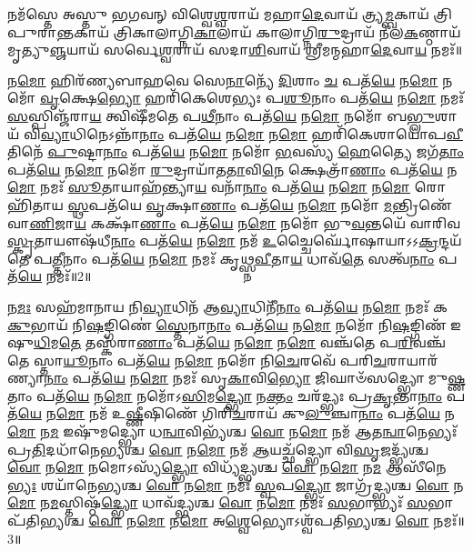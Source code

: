  
𑌨𑌮᳴𑌸𑍍𑌤𑍇 𑌅𑌸𑍍𑌤𑍁 𑌭𑌗𑌵𑌨𑍍 𑌵𑌿𑌶𑍍𑌵𑍇\-\ul{𑌶𑍍𑌵}\-𑌰𑌾𑌯᳴ 𑌮𑌹𑌾\-\ul{𑌦𑍇}\-𑌵𑌾𑌯᳴ 𑌤𑍍𑌰𑍍𑌯\-\ul{𑌮𑍍𑌬}\-𑌕𑌾𑌯᳴ 𑌤𑍍𑌰𑌿𑌪𑍁𑌰𑌾\-\ul{𑌨𑍍𑌤}\-𑌕𑌾𑌯᳴ 𑌤𑍍𑌰𑌿𑌕𑌾𑌲𑌾𑌗𑍍𑌨𑌿\-\ul{𑌕𑌾}\-𑌲𑌾𑌯᳴ 𑌕𑌾𑌲𑌾𑌗𑍍𑌨𑌿\-\ul{𑌰𑍁}\-𑌦𑍍𑌰𑌾𑌯᳴ 𑌨𑍀𑌲\-\ul{𑌕}\-𑌣𑍍𑌠𑌾𑌯᳴ 𑌮𑍃𑌤𑍍𑌯𑍁\-\ul{𑌞𑍍𑌜}\-𑌯𑌾𑌯᳴ 𑌸𑌰𑍍𑌵𑍇\-\ul{𑌶𑍍𑌵}\-𑌰𑌾𑌯᳴ 𑌸𑌦𑌾\-\ul{𑌶𑌿}\-𑌵𑌾𑌯᳴ 𑌶𑍍𑌰𑍀𑌮𑌨𑍍𑌮𑌹𑌾\-\ul{𑌦𑍇}\-𑌵𑌾\-\ul{𑌯} 𑌨𑌮𑌃᳴॥ 

𑌨\-\ul{𑌮𑍋} 𑌹𑌿𑌰᳴𑌣𑍍𑌯𑌬𑌾𑌹𑌵𑍇 𑌸𑍇\-\ul{𑌨𑌾}\-𑌨𑍍𑌯𑍇᳴ \ul{𑌦𑌿}\-𑌶𑌾𑌂 \ul{𑌚} 𑌪𑌤᳴\-\ul{𑌯𑍇} 𑌨\-\ul{𑌮𑍋} 𑌨𑌮𑍋᳴ \ul{𑌵𑍃}\-𑌕𑍍𑌷𑍇\-\ul{𑌭𑍍𑌯𑍋} 𑌹𑌰𑌿᳴𑌕𑍇𑌶𑍇𑌭𑍍𑌯𑌃 𑌪\-\ul{𑌶𑍂}\-𑌨𑌾𑌂 𑌪𑌤᳴\-\ul{𑌯𑍇} 𑌨\-\ul{𑌮𑍋} 𑌨𑌮𑌃᳴ \ul{𑌸}\-𑌸𑍍𑌪𑌿𑌞𑍍𑌜᳴𑌰𑌾\-\ul{𑌯} 𑌤𑍍𑌵𑌿𑌷𑍀᳴𑌮𑌤𑍇 𑌪\-\ul{𑌥𑍀}\-𑌨𑌾𑌂 𑌪𑌤᳴\-\ul{𑌯𑍇} 𑌨\-\ul{𑌮𑍋} 𑌨𑌮𑍋᳴ 𑌬\-\ul{𑌭𑍍𑌲𑍁}\-𑌶𑌾𑌯᳴ 𑌵𑌿\-\ul{𑌵𑍍𑌯𑌾}\-𑌧𑌿𑌨𑍇\-𑌽𑌨𑍍𑌨𑌾᳴\-\ul{𑌨𑌾𑌂} 𑌪𑌤᳴\-\ul{𑌯𑍇} 𑌨\-\ul{𑌮𑍋} 𑌨\-\ul{𑌮𑍋} 𑌹𑌰𑌿᳴𑌕𑍇𑌶𑌾𑌯𑍋𑌪\-\ul{𑌵𑍀}\-𑌤𑌿𑌨𑍇᳴ \ul{𑌪𑍁}\-𑌷𑍍𑌟𑌾\-\ul{𑌨𑌾𑌂} 𑌪𑌤᳴\-\ul{𑌯𑍇} 𑌨\-\ul{𑌮𑍋} 𑌨𑌮𑍋᳴ \ul{𑌭}\-𑌵𑌸𑍍𑌯᳴ \ul{𑌹𑍇}\-𑌤𑍍𑌯𑍈 𑌜𑌗᳴\-\ul{𑌤𑌾𑌂} 𑌪𑌤᳴\-\ul{𑌯𑍇} 𑌨\-\ul{𑌮𑍋} 𑌨𑌮𑍋᳴ \ul{𑌰𑍁}\-𑌦𑍍𑌰𑌾𑌯𑌾᳴𑌤\-\ul{𑌤𑌾}\-𑌵𑌿\-\ul{𑌨𑍇} 𑌕𑍍𑌷𑍇𑌤𑍍𑌰𑌾᳴\-\ul{𑌣𑌾𑌂} 𑌪𑌤᳴\-\ul{𑌯𑍇} 𑌨\-\ul{𑌮𑍋} 𑌨𑌮𑌃᳴ \ul{𑌸𑍂}\-𑌤𑌾𑌯𑌾𑌹᳴𑌨𑍍𑌤𑍍𑌯𑌾\-\ul{𑌯} 𑌵𑌨𑌾᳴\-\ul{𑌨𑌾𑌂} 𑌪𑌤᳴\-\ul{𑌯𑍇} 𑌨\-\ul{𑌮𑍋} 𑌨\-\ul{𑌮𑍋} 𑌰𑍋𑌹𑌿᳴𑌤𑌾𑌯 \ul{𑌸𑍍𑌥}\-𑌪𑌤᳴𑌯𑍇 \ul{𑌵𑍃}\-𑌕𑍍𑌷𑌾\-\ul{𑌣𑌾𑌂} 𑌪𑌤᳴\-\ul{𑌯𑍇} 𑌨\-\ul{𑌮𑍋} 𑌨𑌮𑍋᳴ \ul{𑌮}\-𑌨𑍍𑌤𑍍𑌰𑌿𑌣𑍇᳴ 𑌵𑌾\-\ul{𑌣𑌿}\-𑌜𑌾\-\ul{𑌯} 𑌕𑌕𑍍𑌷𑌾᳴\-\ul{𑌣𑌾𑌂} 𑌪𑌤᳴\-\ul{𑌯𑍇} 𑌨\-\ul{𑌮𑍋} 𑌨𑌮𑍋᳴ 𑌭𑍁\-\ul{𑌵}\-𑌨𑍍𑌤𑌯𑍇᳴ 𑌵𑌾𑌰𑌿𑌵\-\ul{𑌸𑍍𑌕𑍃}\-𑌤𑌾𑌯𑍗𑌷᳴𑌧𑍀\-\ul{𑌨𑌾𑌂} 𑌪𑌤᳴\-\ul{𑌯𑍇} 𑌨\-\ul{𑌮𑍋} 𑌨𑌮᳴ \ul{𑌉}\-𑌚𑍍𑌚𑍈𑌰𑍍𑌘𑍋᳴𑌷𑌾\-𑌯𑌾\-𑌽𑌽\-\-\ul{𑌕𑍍𑌰}\-𑌨𑍍𑌦𑌯᳴𑌤𑍇 𑌪\-\ul{𑌤𑍍𑌤𑍀}\-𑌨𑌾𑌂 𑌪𑌤᳴\-\ul{𑌯𑍇} 𑌨\-\ul{𑌮𑍋} 𑌨𑌮𑌃᳴ 𑌕𑍃𑌥𑍍𑌸𑍍𑌨\-\ul{𑌵𑍀}\-𑌤𑌾\-\ul{𑌯} 𑌧𑌾𑌵᳴\-\ul{𑌤𑍇} 𑌸𑌤𑍍𑌵᳴\-\ul{𑌨𑌾𑌂} 𑌪𑌤᳴\-\ul{𑌯𑍇} 𑌨𑌮𑌃᳴॥2॥ 

𑌨\-\ul{𑌮𑌃} 𑌸𑌹᳴𑌮𑌾𑌨𑌾𑌯 𑌨𑌿\-\ul{𑌵𑍍𑌯𑌾}\-𑌧𑌿𑌨᳴ 𑌆\-\ul{𑌵𑍍𑌯𑌾}\-𑌧𑌿𑌨𑍀᳴\-\ul{𑌨𑌾𑌂} 𑌪𑌤᳴\-\ul{𑌯𑍇} 𑌨\-\ul{𑌮𑍋} 𑌨𑌮𑌃᳴ 𑌕\-\ul{𑌕𑍁}\-𑌭𑌾𑌯᳴ 𑌨𑌿\-\ul{𑌷}\-𑌙𑍍𑌗𑌿𑌣𑍇॑ \ul{𑌸𑍍𑌤𑍇}\-𑌨𑌾\-\ul{𑌨𑌾𑌂} 𑌪𑌤᳴\-\ul{𑌯𑍇} 𑌨\-\ul{𑌮𑍋} 𑌨𑌮𑍋᳴ 𑌨𑌿\-\ul{𑌷}\-𑌙𑍍𑌗𑌿𑌣᳴ 𑌇𑌷𑍁\-\ul{𑌧𑌿}\-𑌮\-\ul{𑌤𑍇} 𑌤𑌸𑍍𑌕᳴𑌰𑌾\-\ul{𑌣𑌾𑌂} 𑌪𑌤᳴\-\ul{𑌯𑍇} 𑌨\-\ul{𑌮𑍋} 𑌨\-\ul{𑌮𑍋} 𑌵𑌞𑍍𑌚᳴𑌤𑍇 𑌪\-\ul{𑌰𑌿}\-𑌵𑌞𑍍𑌚᳴𑌤𑍇 𑌸𑍍𑌤𑌾\-\ul{𑌯𑍂}\-𑌨𑌾𑌂 𑌪𑌤᳴\-\ul{𑌯𑍇} 𑌨\-\ul{𑌮𑍋} 𑌨𑌮𑍋᳴ 𑌨𑌿\-\ul{𑌚𑍇}\-𑌰𑌵𑍇᳴ 𑌪𑌰𑌿\-\ul{𑌚}\-𑌰𑌾𑌯𑌾𑌰᳴𑌣𑍍𑌯𑌾\-\ul{𑌨𑌾𑌂} 𑌪𑌤᳴\-\ul{𑌯𑍇} 𑌨\-\ul{𑌮𑍋} 𑌨𑌮𑌃᳴ 𑌸𑍃\-\ul{𑌕𑌾}\-𑌵𑌿\-\ul{𑌭𑍍𑌯𑍋} 𑌜𑌿𑌘𑌾𑍞᳴𑌸𑌦𑍍𑌭𑍍𑌯𑍋 𑌮𑍁\-\ul{𑌷𑍍𑌣}\-𑌤𑌾𑌂 𑌪𑌤᳴\-\ul{𑌯𑍇} 𑌨\-\ul{𑌮𑍋} 𑌨𑌮𑍋᳴𑌽\-\ul{𑌸𑌿}\-𑌮\-\ul{𑌦𑍍𑌭𑍍𑌯𑍋} 𑌨\-\ul{𑌕𑍍𑌤𑌂} 𑌚𑌰᳴𑌦𑍍𑌭𑍍𑌯𑌃 𑌪𑍍𑌰\-\ul{𑌕𑍃}\-𑌨𑍍𑌤𑌾\-\ul{𑌨𑌾𑌂} 𑌪𑌤᳴\-\ul{𑌯𑍇} 𑌨\-\ul{𑌮𑍋} 𑌨𑌮᳴ 𑌉\-\ul{𑌷𑍍𑌣𑍀}\-𑌷𑌿𑌣𑍇᳴ 𑌗𑌿𑌰𑌿\-\ul{𑌚}\-𑌰𑌾𑌯᳴ 𑌕𑍁\-\ul{𑌲𑍁}\-𑌞𑍍𑌚𑌾\-\ul{𑌨𑌾𑌂} 𑌪𑌤᳴\-\ul{𑌯𑍇} 𑌨\-\ul{𑌮𑍋} 𑌨\-\ul{𑌮} 𑌇𑌷𑍁᳴𑌮𑌦𑍍𑌭𑍍𑌯𑍋 𑌧\-\ul{𑌨𑍍𑌵𑌾}\-𑌵𑌿𑌭𑍍𑌯᳴𑌶𑍍𑌚 \ul{𑌵𑍋} 𑌨\-\ul{𑌮𑍋} 𑌨𑌮᳴ 𑌆𑌤\-\ul{𑌨𑍍𑌵𑌾}\-𑌨𑍇𑌭𑍍𑌯𑌃᳴ 𑌪𑍍𑌰\-\ul{𑌤𑌿}\-𑌦𑌧𑌾᳴𑌨𑍇𑌭𑍍𑌯𑌶𑍍𑌚 \ul{𑌵𑍋} 𑌨\-\ul{𑌮𑍋} 𑌨𑌮᳴ \ul{𑌆}\-𑌯𑌚𑍍𑌛᳴𑌦𑍍𑌭𑍍𑌯𑍋 𑌵𑌿\-\ul{𑌸𑍃}\-𑌜𑌦𑍍𑌭𑍍𑌯᳴𑌶𑍍𑌚 \ul{𑌵𑍋} 𑌨\-\ul{𑌮𑍋} 𑌨𑌮𑍋𑌽𑌸𑍍𑌯᳴\-\ul{𑌦𑍍𑌭𑍍𑌯𑍋} 𑌵𑌿𑌧𑍍𑌯᳴𑌦𑍍𑌭𑍍𑌯𑌶𑍍𑌚 \ul{𑌵𑍋} 𑌨\-\ul{𑌮𑍋} 𑌨\-\ul{𑌮} 𑌆𑌸𑍀᳴𑌨𑍇\-\ul{𑌭𑍍𑌯𑌃} 𑌶𑌯𑌾᳴𑌨𑍇𑌭𑍍𑌯𑌶𑍍𑌚 \ul{𑌵𑍋} 𑌨\-\ul{𑌮𑍋} 𑌨𑌮𑌃᳴ \ul{𑌸𑍍𑌵}\-𑌪\-\ul{𑌦𑍍𑌭𑍍𑌯𑍋} 𑌜𑌾𑌗𑍍𑌰᳴𑌦𑍍𑌭𑍍𑌯𑌶𑍍𑌚 \ul{𑌵𑍋} 𑌨\-\ul{𑌮𑍋} 𑌨\-\ul{𑌮}\-𑌸𑍍𑌤𑌿𑌷𑍍𑌠᳴\-\ul{𑌦𑍍𑌭𑍍𑌯𑍋} 𑌧𑌾𑌵᳴𑌦𑍍𑌭𑍍𑌯𑌶𑍍𑌚 \ul{𑌵𑍋} 𑌨\-\ul{𑌮𑍋} 𑌨𑌮𑌃᳴ \ul{𑌸}\-𑌭𑌾𑌭𑍍𑌯𑌃᳴ \ul{𑌸}\-𑌭𑌾𑌪᳴𑌤𑌿𑌭𑍍𑌯𑌶𑍍𑌚 \ul{𑌵𑍋} 𑌨\-\ul{𑌮𑍋} 𑌨\-\ul{𑌮𑍋} 𑌅\-\ul{𑌶𑍍𑌵𑍇}\-𑌭𑍍𑌯𑍋𑌽𑌶𑍍𑌵᳴𑌪𑌤𑌿𑌭𑍍𑌯𑌶𑍍𑌚 \ul{𑌵𑍋} 𑌨𑌮𑌃᳴॥3॥ 

